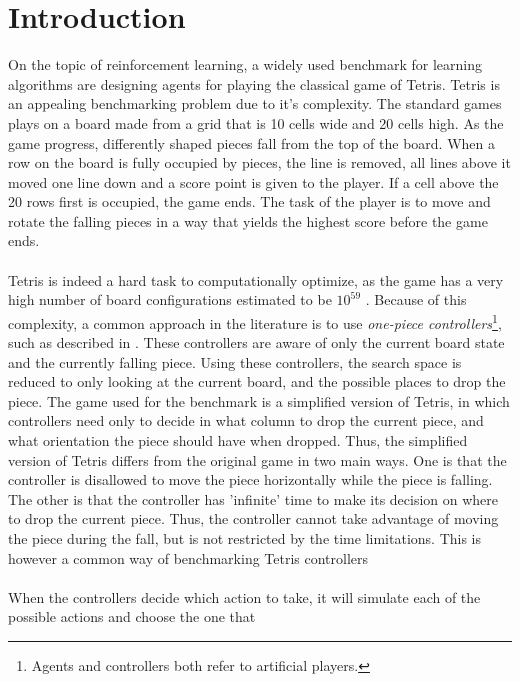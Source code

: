 \section{Introduction \label{sec:intro}}

On the topic of reinforcement learning, a widely used benchmark
for learning algorithms are designing agents 
for playing the classical game of Tetris. Tetris is an 
appealing benchmarking problem due to it's complexity. The 
standard games plays on a board made from a grid that is
10 cells wide and 20 cells high. As the game progress, differently
shaped pieces fall from the top of the board. 
When a row on the board is fully occupied by pieces, the line
is removed, all lines above it moved one line down and a score
point is given to the player. If a cell above the 20 rows first is
occupied, the game ends. The task of the player is to move
and rotate the falling pieces in a way that yields the highest 
score before the game ends.\\
\\
Tetris is indeed a hard task to computationally optimize, as
the game has a very high number of board configurations estimated to be
$10^{59}$ \citep{scherrer2009}. Because of this
complexity, a common approach 
in the literature is to use 
\textit{one-piece controllers}\footnote{Agents and controllers
both refer to artificial players.}, such as described in 
\cite{scherrer2009:b}. These controllers are aware of only 
the current board state and the currently falling piece.
Using these controllers, the search space is reduced 
to only looking at the current board, and the possible 
places to drop the piece. The 
game used for the benchmark is a simplified version of Tetris,
in which 
controllers need only to decide in what column to drop the current
piece, and what orientation the piece should have when dropped.
Thus, the simplified version of Tetris differs from the 
original game in two main ways. One is that the controller is 
disallowed to move the piece horizontally while the piece 
is falling. The other is that the controller has 'infinite'
time to make its decision on where to drop the current piece.
Thus, the controller cannot take advantage of moving the piece 
during the fall, but is not restricted by the time limitations.
This is however a common way of benchmarking Tetris controllers 
\citep{scherrer2009}\\
\\
When the controllers decide which action to take, it will
simulate each of the possible actions and choose the one that

